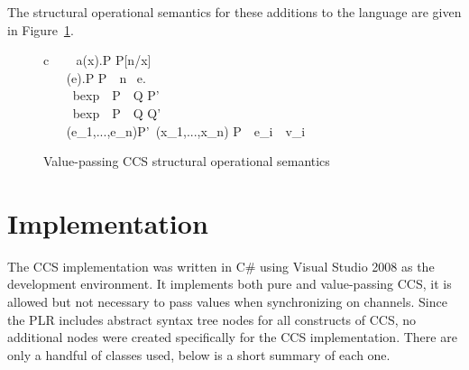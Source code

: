 	The structural operational semantics for these additions to the language are given in Figure~\ref{fig:ccs_value_pass_sos}.	

\begin{figure}[t]
	\label{fig:ccs_value_pass_sos}
	\caption{Value-passing CCS structural operational semantics}

	\begin{ARRAY}{c}
		\ \ \ \Inference{                              }
	                            {a(x).P  P[n/x]} \vspace{10pt}\\
	\ \ \ \Inference{                              }
	                            {(e).P  P}\ \ n \ e. \vspace{10pt}\\
		\ \ \ 
	                            {\ bexp\ \ P\  \ Q \infarrow{\alpha} P'}\ \  \vspace{10pt}\\
		\ \ \ 
	                            {\ bexp\ \ P\  \ Q \infarrow{\alpha} Q'}\ \  \vspace{10pt}\\

		\ \ \ 
	 {(e_1,...,e_n)\infarrow{\alpha}P'}\ (x_1,...,x_n)  P\ \ e_i\ \ v_i\vspace{10pt}\\
	                            
	\end{ARRAY}
\end{figure}


\section{Implementation}

	The CCS implementation was written in C\# using Visual Studio 2008 as the 
	development environment. It implements both pure and value-passing CCS, it 
	is allowed but not necessary to pass values when synchronizing on channels. 
	Since the PLR includes abstract syntax tree nodes for all constructs of CCS, 
	no additional nodes were created specifically for the CCS implementation. 
	There are only a handful of classes used, below is a short summary of each 
	one.

